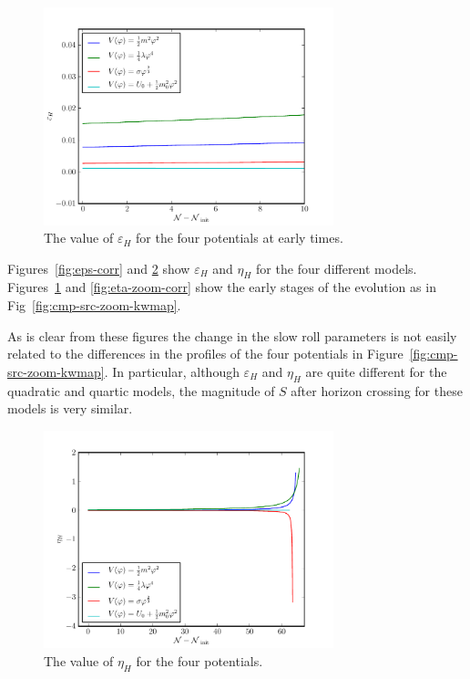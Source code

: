 \begin{figure}
 \centering
 \includegraphics[width=0.75\textwidth]{numerical/graphs/epsilon_slowroll_zoom-large.pdf}
 \caption{The value of $\varepsilon_H$ for the four potentials at early times.}
 \label{fig:eps-zoom-corr}
\end{figure}

Figures~\ref{fig:eps-corr} and \ref{fig:eta-corr} show $\varepsilon_H$ and $\eta_H$ for the
four different models. Figures~\ref{fig:eps-zoom-corr} and
\ref{fig:eta-zoom-corr} show the early stages of the evolution as in
Fig~\ref{fig:cmp-src-zoom-kwmap}.

As is clear from these figures the change in the slow roll parameters is not easily related
to the differences in the profiles of the four potentials in Figure~\ref{fig:cmp-src-zoom-kwmap}. In
particular, although $\varepsilon_H$ and $\eta_H$ are quite different for the quadratic and quartic
models, the magnitude of $S$ after horizon crossing for these models is very similar.
\begin{figure}
 \centering
 \includegraphics[width=0.75\textwidth]{numerical/graphs/eta_slowroll-large.pdf}
 \caption{The value of $\eta_H$ for the four potentials.}
 \label{fig:eta-corr}
\end{figure}

